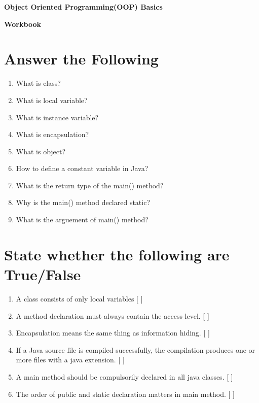 \documentclass[11pt,a4paper]{article}
\def\AnswerBox{\fbox{\begin{minipage}{4in}\hfill\vspace{0.5in}\end{minipage}}}
\begin{document}
\centerline{\huge{ \textbf{Object Oriented Programming(OOP) Basics}}}

\vspace{1pc}

\centerline{\huge{ \textbf{ Workbook}}}

\section*{Answer the Following}
\begin{enumerate}\itemsep10pt

\item What is class?

    \AnswerBox 

\item What is local variable?
    
    \AnswerBox

\item What is instance variable?
    
    \AnswerBox

\item What is encapsulation?
    
    \AnswerBox

\item What is object?
    
    \AnswerBox

\item How to define a constant variable in Java?

    \AnswerBox

\item What is the return type of the main() method?  \underline{\hspace{4cm}}
\item Why is the main() method declared static? \underline{\hspace{4cm}}
\item What is the arguement of main() method? \underline{\hspace{4cm}}


\end{enumerate}
\section*{State whether the following are True/False}
\begin{enumerate}\itemsep2pt
        \item A class consists of only local variables [   ]        
        \item A method declaration must always contain the access level. [    ]
        \item Encapsulation means the same thing as information hiding. [    ]
        \item If a Java source file is compiled successfully, the compilation produces one or more files with a java extension. [    ]
        \item A main method should be compulsorily declared in all java classes. [   ]       
        \item The order of public and static declaration matters in main  method. [ ]
\end{enumerate}
\end{document}
